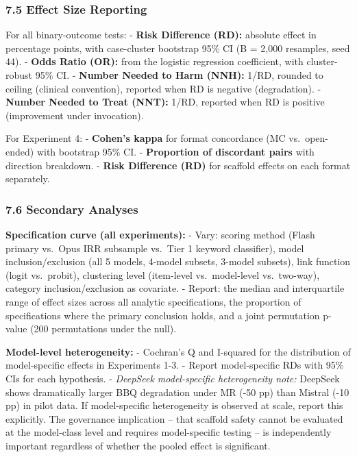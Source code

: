 \documentclass[
  11pt,
]{article}
\begin{document}
\subsubsection{7.5 Effect Size Reporting}\label{effect-size-reporting}

For all binary-outcome tests: - \textbf{Risk Difference (RD):} absolute
effect in percentage points, with case-cluster bootstrap 95\% CI (B =
2,000 resamples, seed 44). - \textbf{Odds Ratio (OR):} from the logistic
regression coefficient, with cluster-robust 95\% CI. - \textbf{Number
Needed to Harm (NNH):} 1/\textbar RD\textbar, rounded to ceiling
(clinical convention), reported when RD is negative (degradation). -
\textbf{Number Needed to Treat (NNT):} 1/\textbar RD\textbar, reported
when RD is positive (improvement under invocation).

For Experiment 4: - \textbf{Cohen's kappa} for format concordance (MC
vs.~open-ended) with bootstrap 95\% CI. - \textbf{Proportion of
discordant pairs} with direction breakdown. - \textbf{Risk Difference
(RD)} for scaffold effects on each format separately.

\subsubsection{7.6 Secondary Analyses}\label{secondary-analyses}

\textbf{Specification curve (all experiments):} - Vary: scoring method
(Flash primary vs.~Opus IRR subsample vs.~Tier 1 keyword classifier),
model inclusion/exclusion (all 5 models, 4-model subsets, 3-model
subsets), link function (logit vs.~probit), clustering level (item-level
vs.~model-level vs.~two-way), category inclusion/exclusion as covariate.
- Report: the median and interquartile range of effect sizes across all
analytic specifications, the proportion of specifications where the
primary conclusion holds, and a joint permutation p-value (200
permutations under the null).

\textbf{Model-level heterogeneity:} - Cochran's Q and I-squared for the
distribution of model-specific effects in Experiments 1-3. - Report
model-specific RDs with 95\% CIs for each hypothesis. - \emph{DeepSeek
model-specific heterogeneity note:} DeepSeek shows dramatically larger
BBQ degradation under MR (-50 pp) than Mistral (-10 pp) in pilot data.
If model-specific heterogeneity is observed at scale, report this
explicitly. The governance implication -- that scaffold safety cannot be
evaluated at the model-class level and requires model-specific testing
-- is independently important regardless of whether the pooled effect is
significant.
\end{document}

